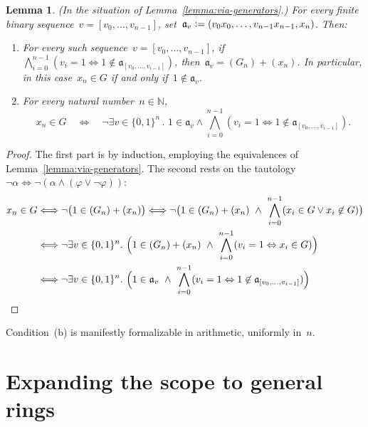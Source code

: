 \documentclass[com,11pt,crcready]{iosart2x}
\theoremstyle{definition}
\theoremstyle{plain}
\newtheorem{lemma}[definition]{Lemma}
\theoremstyle{remark}
\newcommand{\?}{\,{:}\,}
\newcommand{\aaa}{\mathfrak{a}}
\newcommand{\NN}{\mathbb{N}}
\newcommand{\defeq}{\vcentcolon=}
\renewcommand{\_}{\mathpunct{.}\,}
\begin{document}
\begin{lemma}\label{lemma:uniform-char}(In the situation of Lemma~\ref{lemma:via-generators}.)
For every finite binary sequence~$v = [v_0,\ldots,v_{n-1}]$, set~$\aaa_v
\defeq (v_0x_0,\ldots,v_{n-1}x_{n-1},x_n)$. Then:
\begin{enumerate}
\item[(a)] For every such sequence~$v = [v_0,\ldots,v_{n-1}]$, if
$\bigwedge_{i=0}^{n-1} (v_i = 1 \Leftrightarrow 1 \not\in \aaa_{[v_0,\ldots,v_{i-1}]})$,
then~$\aaa_v = (G_n) + (x_n)$.
In particular, in this case~$x_n \in G$ if and only if~$1 \not\in \aaa_v$.
\item[(b)] For every natural number~$n \in \NN$,
\vspace*{-1.2em}
\[ x_n \in G \quad\Longleftrightarrow\quad \neg
  \exists v \in \{0,1\}^n\_
    1 \in \aaa_v \wedge
      \bigwedge_{i=0}^{n-1} (v_i = 1 \Leftrightarrow 1 \not\in \aaa_{[v_0,\ldots,v_{i-1}]}). \]
\end{enumerate}
\end{lemma}

\begin{proof}\belowdisplayskip=-18pt The first part is by induction, employing the equivalences of
Lemma~\ref{lemma:via-generators}. The second rests on the tautology
$\neg\alpha \Longleftrightarrow \neg(\alpha \wedge (\varphi \vee \neg\varphi))$:
\begin{align*}
  x_n \in G &
  \Longleftrightarrow \neg\bigl(1 \in (G_n) + (x_n)\bigr)
  \Longleftrightarrow \neg\bigl(1 \in (G_n) + (x_n) \ \wedge\ \bigwedge_{i=0}^{n-1} (x_i \in G \vee x_i \not\in G)\bigr) \\
  & \Longleftrightarrow \neg\exists v \in \{0,1\}^n\_
    \Bigl(1 \in (G_n) + (x_n) \ \wedge\ \bigwedge_{i=0}^{n-1} (v_i = 1
    \Leftrightarrow x_i \in G)\Bigr) \\
  & \Longleftrightarrow \neg\exists v \in \{0,1\}^n\_
    \Bigl(1 \in \aaa_v \ \wedge\ \bigwedge_{i=0}^{n-1} (v_i = 1
    \Leftrightarrow 1 \not\in \aaa_{[v_0,\ldots,v_{i-1}]})\Bigr)
\end{align*}
\end{proof}

\noindent
Condition~(b) is manifestly formalizable in
arithmetic, uniformly in~$n$.


\section{Expanding the scope to general rings}
\label{sect:wlog}
\end{document}
